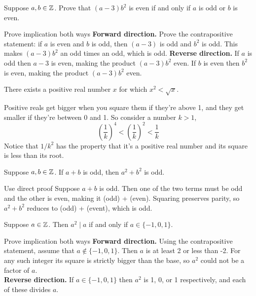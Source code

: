 \documentclass{article}
\begin{document}
\begin{problem}
Suppose $a,b \in \mathbb{Z}$. Prove that $(a-3)b^2$ is even if and only if $a$ is odd or $b$ is even.
\end{problem}
\begin{solution}{Prove implication both ways}
    \textbf{Forward direction.} Prove the contrapositive statement: if $a$ is even and $b$ is odd, then $(a-3)$ is odd and $b^2$ is odd. This makes $(a-3)b^2$ an odd times an odd, which is odd.
    \textbf{Reverse direction.} If $a$ is odd then $a - 3$ is even, making the product $(a-3)b^2$ even. If $b$ is even then $b^2$ is even, making the product $(a-3)b^2$ even.
\end{solution}

\begin{problem}
There exists a positive real number $x$ for which $x^2 < \sqrt{x}$.
\end{problem}
\begin{solution}{}
    Positive reals get bigger when you square them if they're above 1, and they get smaller if they're between 0 and 1. So consider a number $k > 1$,
    $$\left(\frac{1}{k}\right)^4 < \left(\frac{1}{k}\right)^2 < \frac{1}{k}$$
    Notice that $1/k^2$ has the property that it's a positive real number and its square is less than its root.
\end{solution}
\begin{problem}
Suppose $a, b \in \mathbb{Z}$. If $a+ b$ is odd, then $a^2 + b^2$ is odd.
\end{problem}
\begin{solution}{Use direct proof}
    Suppose $a + b$ is odd. Then one of the two terms must be odd and the other is even, making it (odd) + (even). Squaring preserves parity, so $a^2 + b^2$ reduces to (odd) + (event), which is odd.
\end{solution}

\begin{problem}
Suppose $a \in \mathbb{Z}$. Then $a^2 \mid a$ if and only if $a \in \{-1, 0, 1\}$.
\end{problem}
\begin{solution}{Prove implication both ways}
    \textbf{Forward direction.} Using the contrapositive statement, assume that $a \not\in \{-1, 0, 1\}$. Then $a$ is at least 2 or less than -2. For any such integer its square is strictly bigger than the base, so $a^2$ could not be a factor of $a$.
    \\

    \textbf{Reverse direction.} If $a \in \{-1, 0, 1\}$ then $a^2$ is 1, 0, or 1 respectively, and each of these divides $a$.

\end{solution}
\end{document}
